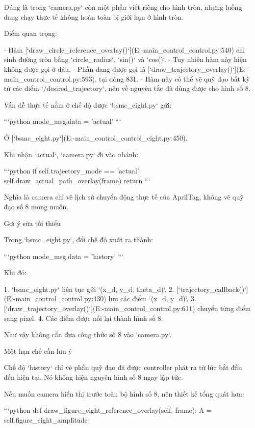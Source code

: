 Đúng là trong `camera.py` còn một phần viết riêng cho hình tròn, nhưng luồng đang chạy thực tế không hoàn toàn bị giới hạn ở hình tròn.

Điểm quan trọng:

- Hàm [`draw_circle_reference_overlay()`](E:\NCKH{}-main\src\amr_control\amr_control\camera.py:540) chỉ sinh đường tròn bằng `circle_radius`, `sin()` và `cos()`.
- Tuy nhiên hàm này hiện không được gọi ở đâu.
- Phần đang được gọi là [`draw_trajectory_overlay()`](E:\NCKH{}-main\src\amr_control\amr_control\camera.py:593), tại dòng 831.
- Hàm này có thể vẽ quỹ đạo bất kỳ từ các điểm `/desired_trajectory`, nên về nguyên tắc đã dùng được cho hình số 8.

Vấn đề thực tế nằm ở chế độ được `bsmc_eight.py` gửi:

```python
mode_msg.data = 'actual'
```

Ở [`bsmc_eight.py`](E:\NCKH{}-main\src\amr_control\amr_control\bsmc_eight.py:450).

Khi nhận `actual`, `camera.py` đi vào nhánh:

```python
if self.trajectory_mode == 'actual':
    self.draw_actual_path_overlay(frame)
    return
```

Nghĩa là camera chỉ vẽ lịch sử chuyển động thực tế của AprilTag, không vẽ quỹ đạo số 8 mong muốn.

Gợi ý sửa tối thiểu

Trong `bsmc_eight.py`, đổi chế độ xuất ra thành:

```python
mode_msg.data = 'history'
```

Khi đó:

1. `bsmc_eight.py` liên tục gửi `(x_d, y_d, theta_d)`.
2. [`trajectory_callback()`](E:\NCKH{}-main\src\amr_control\amr_control\camera.py:430) lưu các điểm `(x_d, y_d)`.
3. [`draw_trajectory_overlay()`](E:\NCKH{}-main\src\amr_control\amr_control\camera.py:611) chuyển từng điểm sang pixel.
4. Các điểm được nối lại thành hình số 8.

Như vậy không cần đưa công thức số 8 vào `camera.py`.

Một hạn chế cần lưu ý

Chế độ `history` chỉ vẽ phần quỹ đạo đã được controller phát ra từ lúc bắt đầu đến hiện tại. Nó không hiện nguyên hình số 8 ngay lập tức.

Nếu muốn camera hiển thị trước toàn bộ hình số 8, nên thiết kế tổng quát hơn:

```python
def draw_figure_eight_reference_overlay(self, frame):
    A = self.figure_eight_amplitude

